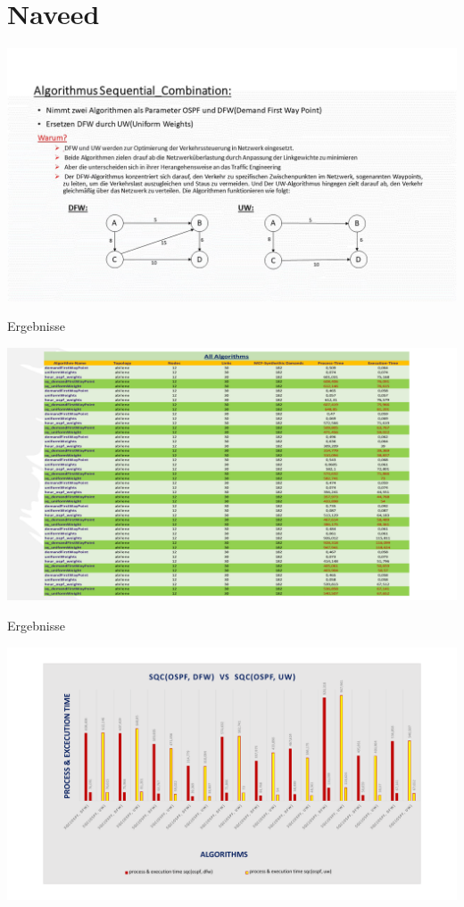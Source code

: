 \documentclass[aspectratio=169,10pt]{beamer}
\begin{document}
\section{Naveed}
\begin{frame}[fragile]{}
\begin{center}
    \includegraphics[width=\textwidth]{images/naveed_7.jpg}
\end{center}
\end{frame}
\begin{frame}{Ergebnisse}
\begin{center}
    \includegraphics[width=\textwidth]{images/naveed_11.pdf}
\end{center}
\end{frame}
\begin{frame}{Ergebnisse}
\begin{center}
    \includegraphics[width=\textwidth]{images/naveed_12.pdf}
\end{center}
\end{frame}
\end{document}
